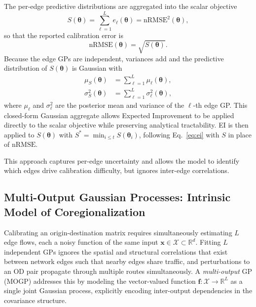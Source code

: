 \documentclass[11pt]{article}
\begin{document}
The per-edge predictive distributions are aggregated into the scalar objective
\begin{equation}
S(\boldsymbol{\theta})
=
\sum_{\ell=1}^{L}
e_\ell(\boldsymbol{\theta})
=
\mathrm{nRMSE}^2(\boldsymbol{\theta}),
\end{equation}
so that the reported calibration error is
\[
\mathrm{nRMSE}(\boldsymbol{\theta})
=
\sqrt{S(\boldsymbol{\theta})}.
\]
Because the edge GPs are independent, variances add and the predictive
distribution of $S(\boldsymbol{\theta})$ is Gaussian with
\begin{align}
\mu_S(\boldsymbol{\theta})
&=
\sum_{\ell=1}^{L}
\mu_\ell(\boldsymbol{\theta}),
\\
\sigma_S^2(\boldsymbol{\theta})
&=
\sum_{\ell=1}^{L}
\sigma_\ell^2(\boldsymbol{\theta}),
\end{align}
where $\mu_\ell$ and $\sigma_\ell^2$ are the posterior mean and variance of the
$\ell$-th edge GP. This closed-form Gaussian aggregate allows Expected Improvement
to be applied directly to the scalar objective while preserving analytical tractability.
EI is then applied to $S(\boldsymbol{\theta})$ with
$S^* = \min_{i \leq t} S(\boldsymbol{\theta}_i)$,
following Eq.~\eqref{eq:ei} with $S$ in place of $\mathrm{nRMSE}$.

This approach captures per-edge uncertainty and allows the model to identify which
edges drive calibration difficulty, but ignores inter-edge correlations.






\subsection{Multi-Output Gaussian Processes: Intrinsic Model of Coregionalization}
\label{subsec:icm}

Calibrating an origin-destination matrix requires simultaneously estimating $L$ edge
flows, each a noisy function of the same input $\mathbf{x} \in \mathcal{X} \subset
\mathbb{R}^d$. Fitting $L$ independent GPs ignores the spatial and structural
correlations that exist between network edges such that nearby edges share traffic, and
perturbations to an OD pair propagate through multiple routes simultaneously.
A \emph{multi-output} GP (MOGP) addresses this by modeling the vector-valued
function $\mathbf{f} : \mathcal{X} \to \mathbb{R}^L$ as a single joint Gaussian
process, explicitly encoding inter-output dependencies in the covariance structure.
\end{document}
